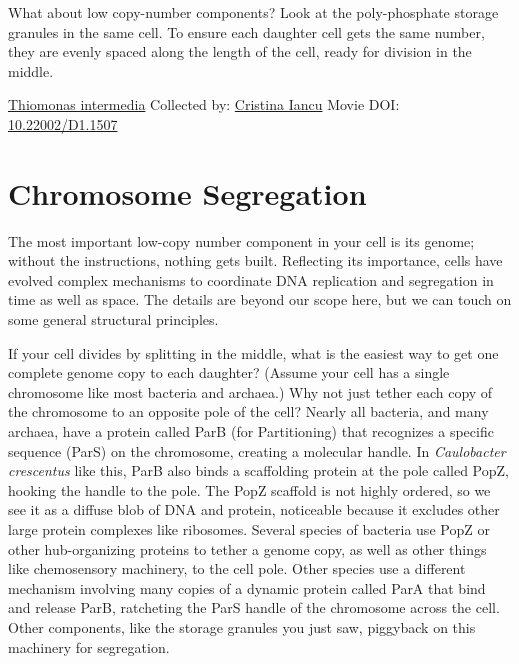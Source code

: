 \documentclass[]{tufte-book}
\begin{document}
What about low copy-number components? Look at the poly-phosphate storage granules in the same cell. To ensure each daughter cell gets the same number, they are evenly spaced along the length of the cell, ready for division in the middle.



\hypertarget{htmlwidget-40feae6d0ed40c138f71}{}

\label{fig:5-1}\protect\hyperlink{tree}{Thiomonas intermedia} Collected by: \protect\hyperlink{cristina_iancu}{Cristina Iancu} Movie DOI: \href{https://doi.org/10.22002/D1.1507}{10.22002/D1.1507}

\hypertarget{chromosome-segregation}{%
\section{Chromosome Segregation}\label{chromosome-segregation}}

The most important low-copy number component in your cell is its genome; without the instructions, nothing gets built. Reflecting its importance, cells have evolved complex mechanisms to coordinate DNA replication and segregation in time as well as space. The details are beyond our scope here, but we can touch on some general structural principles.

If your cell divides by splitting in the middle, what is the easiest way to get one complete genome copy to each daughter? (Assume your cell has a single chromosome like most bacteria and archaea.) Why not just tether each copy of the chromosome to an opposite pole of the cell? Nearly all bacteria, and many archaea, have a protein called ParB (for Partitioning) that recognizes a specific sequence (ParS) on the chromosome, creating a molecular handle. In \emph{Caulobacter crescentus} like this, ParB also binds a scaffolding protein at the pole called PopZ, hooking the handle to the pole. The PopZ scaffold is not highly ordered, so we see it as a diffuse blob of DNA and protein, noticeable because it excludes other large protein complexes like ribosomes. Several species of bacteria use PopZ or other hub-organizing proteins to tether a genome copy, as well as other things like chemosensory machinery, to the cell pole. Other species use a different mechanism involving many copies of a dynamic protein called ParA that bind and release ParB, ratcheting the ParS handle of the chromosome across the cell. Other components, like the storage granules you just saw, piggyback on this machinery for segregation.
\end{document}
